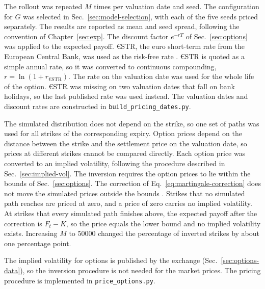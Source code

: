 The rollout was repeated $M$ times per valuation date and seed. The configuration for $G$ was selected in Sec.~\ref{sec:model-selection}, with each of the five seeds priced separately. The results are reported as mean and seed spread, following the convention of Chapter~\ref{sec:exp}. The discount factor $e^{-r T}$ of Sec.~\ref{sec:options} was applied to the expected payoff. €STR, the euro short-term rate from the European Central Bank, was used as the risk-free rate \parencite{europeancentralbankEuroShorttermRate}. €STR is quoted as a simple annual rate, so it was converted to continuous compounding, $r=\ln{(1+r_\text{€STR})}$. The rate on the valuation date was used for the whole life of the option. €STR was missing on two valuation dates that fall on bank holidays, so the last published rate was used instead. The valuation dates and discount rates are constructed in \texttt{build\_pricing\_dates.py}.

The simulated distribution does not depend on the strike, so one set of paths was used for all strikes of the corresponding expiry. Option prices depend on the distance between the strike and the settlement price on the valuation date, so prices at different strikes cannot be compared directly. Each option price was converted to an implied volatility, following the procedure described in Sec.~\ref{sec:implied-vol}. The inversion requires the option prices to lie within the bounds of Sec.~\ref{sec:options}. The correction of Eq.~\eqref{eq:martingale-correction} does not move the simulated prices outside the bounds \parencite{jin-chuanduan1995}. Strikes that no simulated path reaches are priced at zero, and a price of zero carries no implied volatility. At strikes that every simulated path finishes above, the expected payoff after the correction is $F_t - K$, so the price equals the lower bound and no implied volatility exists. Increasing $M$ to \num{50000} changed the percentage of inverted strikes by about one percentage point.

The implied volatility for options is published by the exchange (Sec.~\ref{sec:options-data}), so the inversion procedure is not needed for the market prices. The pricing procedure is implemented in \texttt{price\_options.py}.